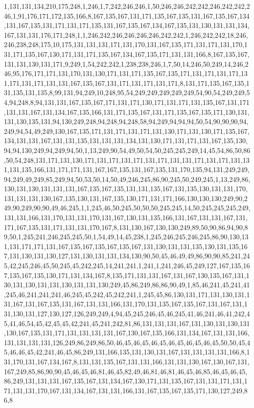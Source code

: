 1,131,131,134,210,175,248,1,246,1,7,242,246,246,1,50,246,246,242,242,246,242,242,246,1,91,176,171,172,135,166,8,167,135,167,131,171,135,167,135,131,167,135,167,134,131,167,135,131,171,131,171,135,131,167,135,167,134,167,135,131,130,131,131,134,167,131,131,176,171,248,1,1,246,242,246,246,246,246,242,242,1,246,242,242,18,246,246,238,248,175,10,175,131,131,131,171,131,170,131,167,135,171,131,171,131,170,131,171,135,167,130,171,131,171,135,167,134,167,135,171,131,131,166,8,167,135,167,131,131,130,131,171,9,249,1,54,242,242,1,238,238,246,1,7,50,14,246,50,249,14,246,246,95,176,171,171,131,170,131,130,171,131,171,135,167,135,171,131,171,131,171,131,171,131,171,131,131,167,135,167,131,171,131,171,131,171,8,131,171,135,167,135,131,135,131,135,8,99,131,94,249,10,248,95,54,249,249,249,249,249,54,90,54,249,249,54,94,248,8,94,131,131,167,135,167,171,131,171,130,171,131,171,131,135,167,131,171,131,131,167,131,134,167,135,166,131,171,135,167,131,171,135,167,135,171,130,131,131,130,135,131,94,130,249,248,94,248,94,248,58,94,249,94,94,94,50,54,90,90,90,94,249,94,54,49,249,130,167,135,171,131,171,131,171,131,130,171,131,130,171,135,167,134,131,131,167,131,131,135,131,131,131,134,131,130,171,131,171,131,167,135,130,94,94,130,249,94,249,94,50,1,13,249,90,54,49,50,54,50,245,245,249,14,45,54,86,50,86,50,54,248,131,171,131,130,171,131,171,131,171,131,171,131,131,171,131,171,131,131,131,135,166,131,171,171,131,167,167,135,131,167,135,131,170,135,94,131,249,249,94,249,49,249,85,249,94,50,53,50,14,50,49,246,245,86,90,245,50,249,245,1,13,249,86,130,131,130,131,131,131,167,135,167,135,131,131,135,167,131,135,130,131,131,170,131,131,131,130,167,135,130,131,167,135,130,171,131,171,166,130,130,130,249,90,249,90,249,90,90,49,46,245,1,1,245,46,50,245,50,50,50,245,245,14,50,245,245,245,249,131,131,166,131,170,131,131,170,131,167,130,131,135,166,131,167,131,131,167,131,171,167,135,131,171,131,131,170,167,8,131,130,167,130,130,249,89,50,90,86,94,90,89,50,1,245,241,246,245,245,50,1,54,49,14,45,238,1,245,246,245,246,245,86,90,130,131,131,171,171,131,167,135,167,135,167,135,167,131,130,131,131,135,130,131,135,167,131,130,131,130,127,131,130,131,131,134,130,90,50,45,46,49,49,86,90,90,85,241,245,42,245,246,45,50,245,45,242,245,14,241,241,1,241,1,241,246,45,249,127,167,135,167,135,167,135,130,171,131,134,167,8,135,171,131,131,167,131,167,130,135,167,131,130,131,130,131,131,130,131,131,130,249,45,86,249,86,86,90,49,1,85,46,241,45,241,41,245,46,241,241,241,46,245,45,242,45,242,241,1,245,45,86,130,131,171,131,130,131,131,167,131,167,135,131,167,131,131,166,131,170,131,135,167,135,167,131,167,131,131,130,131,127,130,127,126,249,249,4,94,45,245,246,45,46,245,41,46,241,46,41,242,45,41,46,54,45,42,45,45,42,241,45,241,242,81,86,131,131,131,167,131,130,131,130,131,130,167,135,131,171,131,131,131,131,167,130,167,135,166,131,134,167,131,131,166,131,131,131,131,126,249,86,249,86,50,46,45,46,45,46,45,46,45,46,45,46,45,50,50,45,45,46,46,45,42,241,46,45,86,249,131,166,135,131,130,131,167,131,131,131,131,166,8,131,170,131,167,134,167,8,131,131,135,167,131,131,166,131,131,130,167,130,167,131,167,249,85,86,90,90,45,46,45,46,81,46,45,82,49,46,81,46,81,46,45,46,85,46,45,46,45,86,249,131,131,131,167,135,167,131,134,167,130,171,131,135,167,131,131,171,131,171,131,131,170,167,131,134,167,131,131,166,131,167,135,167,135,171,130,127,249,86,8